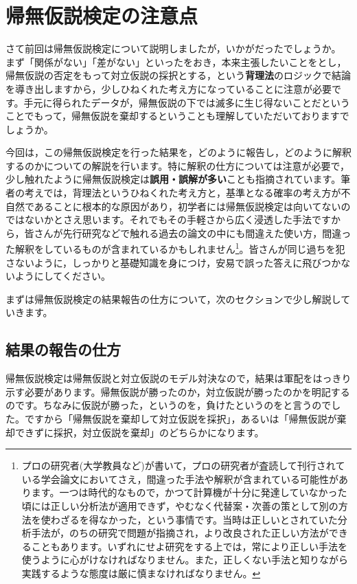 \documentclass{ltjsarticle}
\begin{document}
\chapter{帰無仮説検定の注意点}
\label{chapter19}
さて前回は帰無仮説検定について説明しましたが，いかがだったでしょうか。
まず「関係がない」「差がない」といったをおき，本来主張したいことをとし，帰無仮説の否定をもって対立仮説の採択とする，という\textbf{背理法}のロジックで結論を導き出しますから，少しひねくれた考え方になっていることに注意が必要です。手元に得られたデータが，帰無仮説の下では滅多に生じ得ないことだということでもって，帰無仮説を棄却するということも理解していただいておりますでしょうか。

今回は，この帰無仮説検定を行った結果を，どのように報告し，どのように解釈するのかについての解説を行います。特に解釈の仕方については注意が必要で，少し触れたように帰無仮説検定は\textbf{誤用・誤解が多い}ことも指摘されています。筆者の考えでは，背理法というひねくれた考え方と，基準となる確率の考え方が不自然であることに根本的な原因があり，初学者には帰無仮説検定は向いてないのではないかとさえ思います。それでもその手軽さから広く浸透した手法ですから，皆さんが先行研究などで触れる過去の論文の中にも間違えた使い方，間違った解釈をしているものが含まれているかもしれません\footnote{プロの研究者(大学教員など)が書いて，プロの研究者が査読して刊行されている学会論文においてさえ，間違った手法や解釈が含まれている可能性があります。一つは時代的なもので，かつて計算機が十分に発達していなかった頃には正しい分析法が適用できず，やむなく代替案・次善の策として別の方法を使わざるを得なかった，という事情です。当時は正しいとされていた分析手法が，のちの研究で問題が指摘され，より改良された正しい方法ができることもあります。いずれにせよ研究をする上では，常により正しい手法を使うように心がけなければなりません。また，正しくない手法と知りながら実践するような態度は厳に慎まなければなりません。}。皆さんが同じ過ちを犯さないように，しっかりと基礎知識を身につけ，安易で誤った答えに飛びつかないようにしてください。

まずは帰無仮説検定の結果報告の仕方について，次のセクションで少し解説していきます。

\section{結果の報告の仕方}
帰無仮説検定は帰無仮説と対立仮説のモデル対決なので，結果は軍配をはっきり示す必要があります。帰無仮説が勝ったのか，対立仮説が勝ったのかを明記するのです。ちなみに仮説が勝った，というのを，負けたというのをと言うのでした。ですから「帰無仮説を棄却して対立仮説を採択」，あるいは「帰無仮説が棄却できずに採択，対立仮説を棄却」のどちらかになります。
\end{document}

